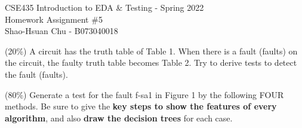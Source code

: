 \documentclass[12pt,answers]{exam}
\begin{document}
\begin{center}
\LARGE CSE435 Introduction to EDA \& Testing - Spring 2022 \\
\Large Homework Assignment \#5 \\
\Large Shao-Hsuan Chu - B073040018 \\
\end{center}
\bigskip

\begin{questions}
  \question (20\%) A circuit has the truth table of Table 1. When there is a fault (faults) on the circuit, the faulty truth table becomes Table 2. Try to derive tests to detect the fault (faults).
  
  \begin{solution}
    
  \end{solution}

  \question (80\%) Generate a test for the fault f-sa1 in Figure 1 by the following FOUR methods. Be sure to give the \textbf{key steps to show the features of every algorithm}, and also \textbf{draw the decision trees} for each case.
   


\end{questions}
\end{document}
